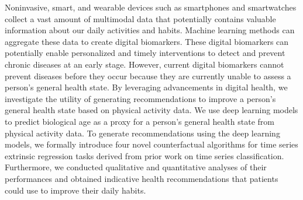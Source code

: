 Noninvasive, smart, and wearable devices such as smartphones and smartwatches collect a vast amount of multimodal data that potentially contains valuable information about our daily activities and habits.
% 
Machine learning methods can aggregate these data to create digital biomarkers. These digital biomarkers can potentially enable personalized and timely interventions to detect and prevent chronic diseases at an early stage. However, current digital biomarkers cannot prevent diseases before they occur because they are currently unable to assess a person's general health state. 
% 
By leveraging advancements in digital health, we investigate the utility of generating recommendations to improve a person's general health state based on physical activity data. We use deep learning models to predict biological age as a proxy for a person's general health state from physical activity data.
% 
To generate recommendations using the deep learning models, we formally introduce four novel counterfactual algorithms for time series extrinsic regression tasks derived from prior work on time series classification. Furthermore, we conducted qualitative and quantitative analyses of their performances and obtained indicative health recommendations that patients could use to improve their daily habits.